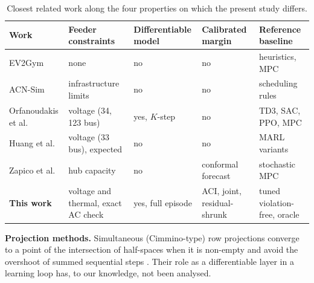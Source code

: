 \documentclass[11pt]{article}
\begin{document}
\begin{table}[h]\centering\footnotesize\setlength{\tabcolsep}{3pt}
\begin{tabular}{@{}L{3.0cm}L{2.6cm}L{2.7cm}L{2.6cm}L{3.0cm}@{}}\toprule
Work & Feeder constraints & Differentiable model & Calibrated margin & Reference baseline\\\midrule
EV2Gym \cite{ev2gym} & none & no & no & heuristics, MPC\\
ACN-Sim \cite{acnsim} & infrastructure limits & no & no & scheduling rules\\
Orfanoudakis et al. \cite{pitd3} & voltage (34, 123 bus) & yes, $K$-step & no & TD3, SAC, PPO, MPC\\
Huang et al. \cite{tlmappo} & voltage (33 bus), expected & no & no & MARL variants\\
Zapico et al. \cite{zapico} & hub capacity & no & conformal forecast & stochastic MPC\\
\textbf{This work} & voltage and thermal, exact AC check & yes, full episode & ACI, joint, residual-shrunk & tuned violation-free, oracle\\\bottomrule
\end{tabular}\caption{Closest related work along the four properties on which the present study differs.}\label{tab:rel}\end{table}

\textbf{Projection methods.} Simultaneous (Cimmino-type) row projections converge to a point of the intersection of half-spaces when it is non-empty and avoid the overshoot of summed sequential steps \cite{cimmino,censor}. Their role as a differentiable layer in a learning loop has, to our knowledge, not been analysed.

\end{document}
